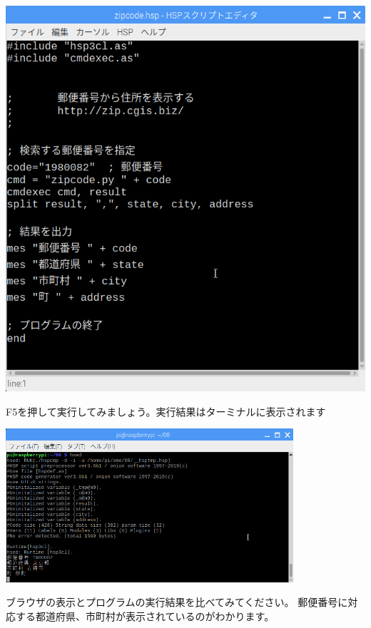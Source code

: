 \begin{center}
\includegraphics[width=13.951cm]{./text08-img/textbook-img056.png}

\end{center}

\bigskip

\clearpage
F5を押して実行してみましょう。実行結果はターミナルに表示されます



\begin{center}
\includegraphics[width=0.8\textwidth]{./text08-img/textbook-img057.png}

\end{center}
ブラウザの表示とプログラムの実行結果を比べてみてください。
郵便番号に対応する都道府県、市町村が表示されているのがわかります。



